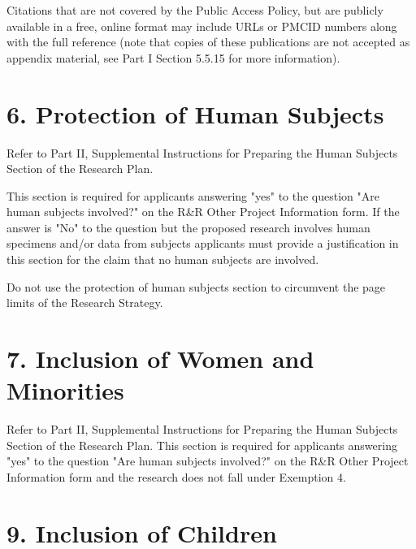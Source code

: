 \documentclass[11pt,notitlepage]{article}
\begin{document}
Citations that are not covered by the Public Access Policy, but are publicly available in a free, online format may include URLs or PMCID numbers along with the full reference (note that copies of these publications are not accepted as appendix material, see Part I Section 5.5.15 for more information).


\newpage

\section*{6. Protection of Human Subjects}

Refer to Part II, Supplemental Instructions for Preparing the Human Subjects Section of the Research Plan.

This section is required for applicants answering "yes" to the question "Are human subjects involved?" on the R\&R Other Project Information form. If the answer is "No" to the question but the proposed research involves human specimens and/or data from subjects applicants must provide a justification in this section for the claim that no human subjects are involved.

Do not use the protection of human subjects section to circumvent the page limits of the Research Strategy.


\newpage

\section*{7. Inclusion of Women and Minorities}

Refer to Part II, Supplemental Instructions for Preparing the Human Subjects Section of the Research Plan. This section is required for applicants answering "yes" to the question "Are human subjects involved?" on the R\&R Other Project Information form and the research does not fall under Exemption 4.


\newpage

\section*{9. Inclusion of Children}
\end{document}
